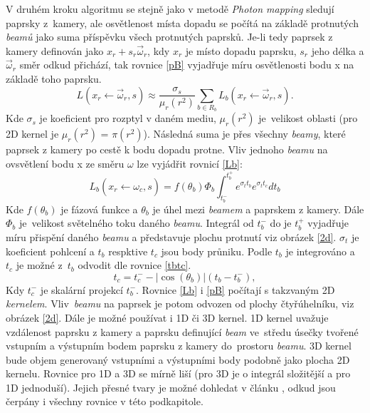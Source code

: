 V druhém kroku algoritmu se stejně jako v metodě \textit{Photon mapping} sledují paprsky z~kamery, ale osvětlenost místa dopadu se počítá na základě protnutých \textit{beamů} jako suma příspěvku všech protnutých paprsků. Je-li tedy paprsek z kamery definován jako $x_r + s_r \vec{\omega}_r$, kdy $x_r$ je místo dopadu paprsku, $s_r$ jeho délka a $\vec{\omega}_r$ směr odkud přichází, tak rovnice \ref{pB} vyjadřuje míru osvětlenosti bodu x na základě toho paprsku.\\
\begin{equation}\label{pB}
    L(x_r \xleftarrow[]{} \vec{\omega}_r,s) \approx \frac{\sigma_s}{\mu_r(r^2)}\sum_{b \in R_b} L_b(x_r \xleftarrow[]{}  \vec{\omega}_r, s).
\end{equation}
Kde $\sigma_s$ je koeficient pro rozptyl v daném mediu, $\mu_r(r^2)$ je~velikost oblasti (pro 2D kernel je $\mu_r(r^2)$ = $\pi(r^2)$). Následná suma je přes všechny \textit{beamy}, které paprsek z kamery po cestě k bodu dopadu protne. Vliv jednoho \textit{beamu} na ovsvětlení bodu x ze směru $\omega$ lze vyjádřit rovnicí \ref{Lb}:\\
 \begin{equation}\label{Lb}
    L_b(x_r \xleftarrow[]{}\omega_c,s) = f(\theta_b)\Phi_b\int_{t_b^-}^{t_b^+}e^{\sigma_t t_b}e^{\sigma_t t_c}dt_b
\end{equation}
Kde $f(\theta_b)$ je fázová funkce a $\theta_b$ je úhel mezi \textit{beamem} a paprskem z kamery. Dále $\Phi_b$ je~velikost světelného toku daného \textit{beamu}. Integrál od $t_b^-$ do je $t_b^+$ vyjadřuje míru přispění daného \textit{beamu} a představuje plochu protnutí viz obrázek \ref{2d}. $\sigma_t$ je koeficient pohlcení a  $t_b$ respktive $t_c$ jsou body průniku. Podle $t_b$ je integrováno a $t_c$ je možné z~$t_b$ odvodit dle rovnice \ref{tbtc}.
 \begin{equation}\label{tbtc}
    t_c = t_c^- - |\cos(\theta_b)|(t_b - t_b^-),
\end{equation}
Kdy $t_c^-$ je skalární projekcí $t_b^-$.
Rovnice \ref{Lb} i \ref{pB} počítají s takzvaným 2D \textit{kernelem}. Vliv~\textit{beamu} na paprsek je potom odvozen od plochy čtyřúhelníku, viz obrázek \ref{2d}. Dále je možné používat i 1D či 3D kernel. 1D kernel uvažuje vzdálenost paprsku z kamery a paprsku definující \textit{beam} ve~středu úsečky tvořené vstupním a výstupním bodem paprsku z kamery do~prostoru \textit{beamu}. 3D kernel bude objem generovaný vstupními a výstupními body podobně jako plocha 2D kernelu. Rovnice pro 1D a 3D se mírně liší (pro 3D je o integrál složitější a pro 1D jednoduší). Jejich přesné tvary je možné dohledat v článku \cite{comprehensive}, odkud jsou čerpány i všechny rovnice v této podkapitole.

